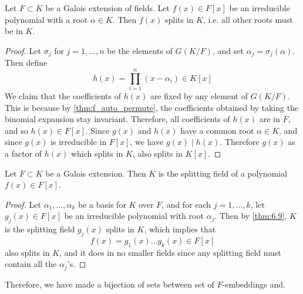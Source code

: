   \begin{lemma} 
    \label{thm:6.9}
    Let $F \subset K$ be a Galois extension of fields. Let $f(x) \in F[x]$ be an irreducible polynomial with a root $\alpha \in K$. Then $f(x)$ splits in $K$, i.e. all other roots must be in $K$.  
  \end{lemma} 
  \begin{proof}
    Let $\sigma_j$ for $j = 1, \ldots, n$ be the elements of $G(K/F)$, and set $\alpha_j = \sigma_j (\alpha)$. Then define 
    \begin{equation}
      h(x) = \prod_{i=1}^n (x - \alpha_i)  \in K[x]
    \end{equation}
    We claim that the coefficients of $h(x)$ are fixed by any element of $G(K/F)$. This is because by \ref{thm:f_auto_permute}, the coefficients obtained by taking the binomial expansion stay invariant. Therefore, all coefficients of $h(x)$ are in $F$, and so $h(x) \in F[x]$. Since $g(x)$ and $h(x)$ have a common root $\alpha \in K$, and since $g(x)$ is irreducible in $F[x]$, we have $g(x) \mid h(x)$. Therefore $g(x)$ as a factor of $h(x)$ which splits in $K$, also splits in $K[x]$. 
  \end{proof}

  \begin{theorem}
    Let $F \subset K$ be a Galois extension. Then $K$ is the splitting field of a polynomial $f(x) \in F[x]$. 
  \end{theorem}
  \begin{proof}
    Let $\alpha_1, \ldots, \alpha_k$ be a basis for $K$ over $F$, and for each $j = 1, \ldots, k$, let $g_j (x) \in F[x]$ be an irreducible polynomial with root $\alpha_j$. Then by \ref{thm:6.9}, $K$ is the splitting field $g_j(x)$ splits in $K$, which implies that 
    \begin{equation}
      f(x) = g_1 (x) \ldots g_k(x) \in F[x]
    \end{equation}
    also splits in $K$, and it does in no smaller fields since any splitting field must contain all the $\alpha_j$'s. 
  \end{proof}

  Therefore, we have made a bijection of sets between set of $F$-embeddings and.  

